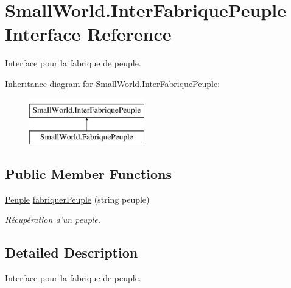 \hypertarget{interface_small_world_1_1_inter_fabrique_peuple}{\section{Small\-World.\-Inter\-Fabrique\-Peuple Interface Reference}
\label{interface_small_world_1_1_inter_fabrique_peuple}
}


Interface pour la fabrique de peuple.  


Inheritance diagram for Small\-World.\-Inter\-Fabrique\-Peuple\-:\begin{figure}[H]
\begin{center}
\leavevmode
\includegraphics[height=2.000000cm]{interface_small_world_1_1_inter_fabrique_peuple}
\end{center}
\end{figure}
\subsection*{Public Member Functions}
\begin{DoxyCompactItemize}
\item 
\hyperlink{class_small_world_1_1_peuple}{Peuple} \hyperlink{interface_small_world_1_1_inter_fabrique_peuple_a5f4c738231b141ffc6afd295d259a80a}{fabriquer\-Peuple} (string peuple)
\begin{DoxyCompactList}\small\item\em Récupération d'un peuple. \end{DoxyCompactList}\end{DoxyCompactItemize}


\subsection{Detailed Description}
Interface pour la fabrique de peuple. 

